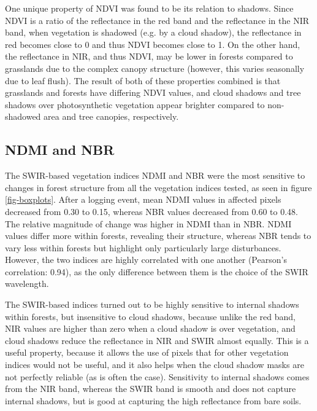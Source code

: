 \documentclass[a4paper,12pt]{scrbook}
\begin{document}
One unique property of \ac{NDVI} was found to be its relation to shadows. Since \ac{NDVI} is a ratio of the reflectance in the red band and the reflectance in the \ac{NIR} band, when vegetation is shadowed (e.g. by a cloud shadow), the reflectance in red becomes close to 0 and thus \ac{NDVI} becomes close to 1. On the other hand, the reflectance in \ac{NIR}, and thus \ac{NDVI}, may be lower in forests compared to grasslands due to the complex canopy structure (however, this varies seasonally due to leaf flush). The result of both of these properties combined is that grasslands and forests have differing \ac{NDVI} values, and cloud shadows and tree shadows over photosynthetic vegetation appear brighter compared to non-shadowed area and tree canopies, respectively.

\subsection{NDMI and NBR}

The \ac{SWIR}-based vegetation indices \ac{NDMI} and \ac{NBR} were the most sensitive to changes in forest structure from all the vegetation indices tested, as seen in figure \ref{fig-boxplots}. After a logging event, mean \ac{NDMI} values in affected pixels decreased from 0.30 to 0.15, whereas \ac{NBR} values decreased from 0.60 to 0.48. The relative magnitude of change was higher in \ac{NDMI} than in \ac{NBR}. \ac{NDMI} values differ more within forests, revealing their structure, whereas \ac{NBR} tends to vary less within forests but highlight only particularly large disturbances. However, the two indices are highly correlated with one another (Pearson's correlation: 0.94), as the only difference between them is the choice of the \ac{SWIR} wavelength.

The \ac{SWIR}-based indices turned out to be highly sensitive to internal shadows within forests, but insensitive to cloud shadows, because unlike the red band, \ac{NIR} values are higher than zero when a cloud shadow is over vegetation, and cloud shadows reduce the reflectance in \ac{NIR} and \ac{SWIR} almost equally. This is a useful property, because it allows the use of pixels that for other vegetation indices would not be useful, and it also helps when the cloud shadow masks are not perfectly reliable (as is often the case). Sensitivity to internal shadows comes from the \ac{NIR} band, whereas the \ac{SWIR} band is smooth and does not capture internal shadows, but is good at capturing the high reflectance from bare soils.
\end{document}
